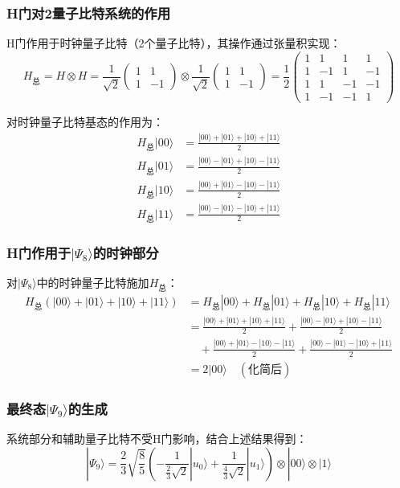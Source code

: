 \documentclass{article}
\begin{document}
\subsubsection{H门对2量子比特系统的作用}
H门作用于时钟量子比特（2个量子比特），其操作通过张量积实现：
\[
H_{\text{总}} = H \otimes H = \frac{1}{\sqrt{2}}
\begin{pmatrix} 1 & 1 \\ 1 & -1 \end{pmatrix} 
\otimes 
\frac{1}{\sqrt{2}}
\begin{pmatrix} 1 & 1 \\ 1 & -1 \end{pmatrix} 
= \frac{1}{2}
\begin{pmatrix} 
1 & 1 & 1 & 1 \\ 
1 & -1 & 1 & -1 \\ 
1 & 1 & -1 & -1 \\ 
1 & -1 & -1 & 1 
\end{pmatrix}
\]

对时钟量子比特基态的作用为：
\begin{align*}
H_{\text{总}}|00\rangle &= \frac{|00\rangle + |01\rangle + |10\rangle + |11\rangle}{2} \\
H_{\text{总}}|01\rangle &= \frac{|00\rangle - |01\rangle + |10\rangle - |11\rangle}{2} \\
H_{\text{总}}|10\rangle &= \frac{|00\rangle + |01\rangle - |10\rangle - |11\rangle}{2} \\
H_{\text{总}}|11\rangle &= \frac{|00\rangle - |01\rangle - |10\rangle + |11\rangle}{2}
\end{align*}

\subsubsection{H门作用于$|\Psi_8\rangle$的时钟部分}
对$|\Psi_8\rangle$中的时钟量子比特施加$H_{\text{总}}$：
\begin{align*}
H_{\text{总}} \left( |00\rangle + |01\rangle + |10\rangle + |11\rangle \right) &= 
H_{\text{总}}|00\rangle + H_{\text{总}}|01\rangle + H_{\text{总}}|10\rangle + H_{\text{总}}|11\rangle \\
&= \frac{|00\rangle + |01\rangle + |10\rangle + |11\rangle}{2} + \frac{|00\rangle - |01\rangle + |10\rangle - |11\rangle}{2} \\
&\quad + \frac{|00\rangle + |01\rangle - |10\rangle - |11\rangle}{2} + \frac{|00\rangle - |01\rangle - |10\rangle + |11\rangle}{2} \\
&= 2|00\rangle \quad (\text{化简后})
\end{align*}

\subsubsection{最终态$|\Psi_9\rangle$的生成}
系统部分和辅助量子比特不受H门影响，结合上述结果得到：
\[
|\Psi_9\rangle = 
\frac{2}{3}\sqrt{\frac{8}{5}} \left( -\frac{1}{\frac{2}{3}\sqrt{2}} |u_0\rangle + \frac{1}{\frac{4}{3}\sqrt{2}} |u_1\rangle \right) 
\otimes 
|00\rangle 
\otimes 
|1\rangle
\]
\end{document}
